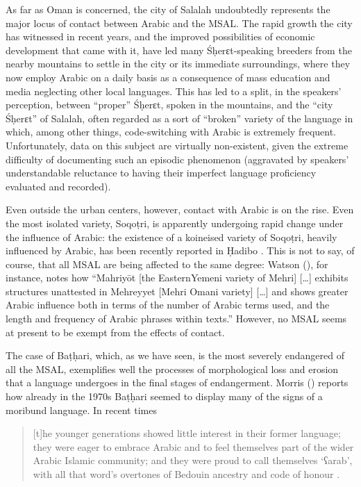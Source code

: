 \documentclass[output=paper]{langsci/langscibook}
\begin{document}
As far as Oman is concerned, the city of Salalah undoubtedly represents the major locus of contact between Arabic and the MSAL. The rapid growth the city has witnessed in recent years, and the improved possibilities of economic development that came with it, have led many Śḥerɛt-speaking breeders from the nearby mountains to settle in the city or its immediate surroundings, where they now employ Arabic on a daily basis as a consequence of mass education and media neglecting other local languages. This has led to a split, in the speakers’ perception, between ``proper'' Śḥerɛt, spoken in the mountains, and the ``city Śḥerɛt'' of Salalah, often regarded as a sort of ``broken'' variety of the language in which, among other things, code-switching with Arabic is extremely frequent. Unfortunately, data on this subject are virtually non-existent, given the extreme difficulty of documenting such an episodic phenomenon (aggravated by speakers’ understandable reluctance to having their imperfect language proficiency evaluated and recorded). 

Even outside the urban centers, however, contact with Arabic is on the rise. Even the most isolated variety, Soqoṭri, is apparently undergoing rapid change under the influence of Arabic: the existence of a koineised variety of Soqoṭri, heavily influenced by Arabic, has been recently reported in Ḥadibo \citep[27]{Morris2017}. This is not to say, of course, that all MSAL are being affected to the same degree: Watson (\citeyear[3]{Watson2012}), for instance, notes how “Mahriyōt [the EasternYemeni variety of Mehri] […] exhibits structures unattested in Mehreyyet [Mehri Omani variety] […] and shows greater Arabic influence both in terms of the number of Arabic terms used, and the length and frequency of Arabic phrases within texts.” However, no MSAL seems at present to be exempt from the effects of contact.

The case of Baṭḥari, which, as we have seen, is the most severely endangered of all the MSAL, exemplifies well the processes of morphological loss and erosion that a language undergoes in the final stages of endangerment. Morris (\citeyear[12]{Morris2017}) reports how already in the 1970s Baṭḥari seemed to display many of the signs of a moribund language. In recent times

\begin{quote}
[t]he younger generations showed little interest in their former language; they were eager to embrace Arabic and to feel themselves part of the wider Arabic Islamic community; and they were proud to call themselves ‘ʕarab’, with all that word’s overtones of Bedouin ancestry and code of honour \citep[11]{Morris2017}.
\end{quote}
\end{document}
